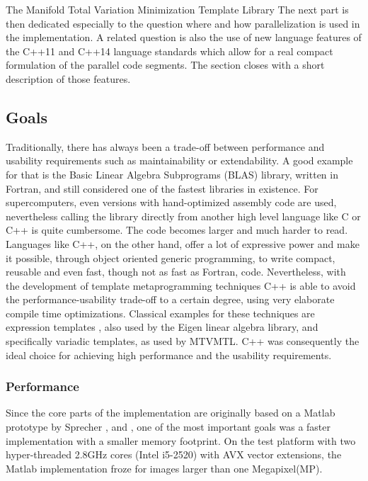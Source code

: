 \begin{chapter}{The Manifold Total Variation Minimization Template Library}
The next part is then dedicated especially to the question where and how parallelization is used in the implementation.
A related question is also the use of new language features of the C++11 and C++14 language standards 
which allow for a real compact formulation of the parallel code segments. 
The section closes with a short description of those features.

\subsection{Goals} %
\label{sub:Goals}
Traditionally, there has always been a trade-off between performance and usability requirements such as
maintainability or extendability. A good example for that is the Basic Linear Algebra Subprograms 
(BLAS) library, written in Fortran, and still considered one of the fastest libraries in existence. 
For supercomputers, even versions with hand-optimized assembly code are used, nevertheless calling
the library directly from another high level language like C or C++ is quite cumbersome. The code becomes
larger and much harder to read. \\

Languages like C++, on the other hand, offer a lot of expressive power and make it possible, through object oriented
generic programming, to write compact, reusable and even fast, though not as fast as Fortran, code. Nevertheless,
with the development of template metaprogramming techniques C++ is able to avoid the performance-usability
trade-off to a certain degree, using very elaborate compile time optimizations. Classical examples for these techniques are expression templates \cite{blitz}, also used by the Eigen linear algebra library, and specifically variadic templates, as used by MTVMTL.
C++ was consequently the ideal choice for achieving high performance and the usability requirements.

\subsubsection{Performance} %
\label{ssub:Performance}
Since the core parts of the implementation are originally based on a Matlab prototype by Sprecher \cite{SprecherIRLS}, \cite{manuel} and \cite{mara}, one of the most important
goals was a faster implementation with a smaller memory footprint. On the test platform with two hyper-threaded 2.8GHz cores (Intel i5-2520) with AVX vector extensions,
the Matlab implementation froze for images larger than one Megapixel(MP).\\


\end{chapter}
